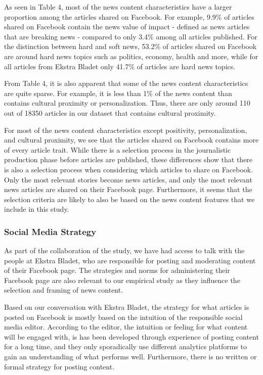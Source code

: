 \documentclass[
]{article}
\begin{document}
\noindent As seen in Table 4, most of the news content characteristics
have a larger proportion among the articles shared on Facebook. For
example, 9.9\% of articles shared on Facebook contain the news value of
impact - defined as news articles that are breaking news - compared to
only 3.4\% among all articles published. For the distinction between
hard and soft news, 53.2\% of articles shared on Facebook are around
hard news topics such as politics, economy, health and more, while for
all articles from Ekstra Bladet only 41.7\% of articles are hard news
topics.

From Table 4, it is also apparent that some of the news content
characteristics are quite sparse. For example, it is less than 1\% of
the news content than contains cultural proximity or personalization.
Thus, there are only around 110 out of 18350 articles in our dataset
that contains cultural proximity.

For most of the news content characteristics except positivity,
personalization, and cultural proximity, we see that the articles shared
on Facebook contains more of every article trait. While there is a
selection process in the journalistic production phase before articles
are published, these differences show that there is also a selection
process when considering which articles to share on Facebook. Only the
most relevant stories become news articles, and only the most relevant
news articles are shared on their Facebook page. Furthermore, it seems
that the selection criteria are likely to also be based on the news
content features that we include in this study.

\hypertarget{social-media-strategy}{%
\subsubsection{Social Media Strategy}\label{social-media-strategy}}

\noindent As part of the collaboration of the study, we have had access
to talk with the people at Ekstra Bladet, who are responsible for
posting and moderating content of their Facebook page. The strategies
and norms for administering their Facebook page are also relevant to our
empirical study as they influence the selection and framing of news
content.

Based on our conversation with Ekstra Bladet, the strategy for what
articles is posted on Facebook is mostly based on the intuition of the
responsible social media editor. According to the editor, the intuition
or feeling for what content will be engaged with, is has been developed
through experience of posting content for a long time, and they only
sporadically use different analytics platforms to gain an understanding
of what performs well. Furthermore, there is no written or formal
strategy for posting content.
\end{document}
